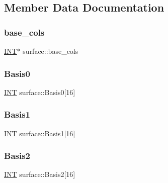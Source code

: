 \subsection{Member Data Documentation}
\mbox{\label{classsurface_a9b3361daceaf2e36149537590658c298}} 
\subsubsection{\texorpdfstring{base\+\_\+cols}{base\_cols}}
{\footnotesize\ttfamily \mbox{\hyperlink{galois_8h_a09fddde158a3a20bd2dcadb609de11dc}{I\+NT}}$\ast$ surface\+::base\+\_\+cols}

\mbox{\label{classsurface_a2344c514b6935202228f029c5cbb3d00}} 
\subsubsection{\texorpdfstring{Basis0}{Basis0}}
{\footnotesize\ttfamily \mbox{\hyperlink{galois_8h_a09fddde158a3a20bd2dcadb609de11dc}{I\+NT}} surface\+::\+Basis0\mbox{[}16\mbox{]}}

\mbox{\label{classsurface_a48f9039fd37177e42fedc013c112b9c0}} 
\subsubsection{\texorpdfstring{Basis1}{Basis1}}
{\footnotesize\ttfamily \mbox{\hyperlink{galois_8h_a09fddde158a3a20bd2dcadb609de11dc}{I\+NT}} surface\+::\+Basis1\mbox{[}16\mbox{]}}

\mbox{\label{classsurface_a7fb5fdb9e32c46d3bf28d59e3c3d19f9}} 
\subsubsection{\texorpdfstring{Basis2}{Basis2}}
{\footnotesize\ttfamily \mbox{\hyperlink{galois_8h_a09fddde158a3a20bd2dcadb609de11dc}{I\+NT}} surface\+::\+Basis2\mbox{[}16\mbox{]}}

\mbox{\label{classsurface_a8cf442cb4d0d4919e83ab4695b9e849a}} 
